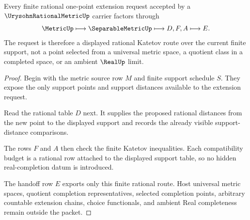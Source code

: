\begin{theorem}
\label{thm:urysohn-rational-metric-one-point-extension}
Every finite rational one-point extension request accepted by a $\UrysohnRationalMetricUp$ carrier factors through
$$
\MetricUp \longmapsto \SeparableMetricUp \longmapsto D,F,A \longmapsto E .
$$
The request is therefore a displayed rational Katetov route over the current finite support, not a point selected from a universal metric space, a quotient class in a completed space, or an ambient $\RealUp$ limit.
\end{theorem}
\begin{proof}
Begin with the metric source row $M$ and finite support schedule $S$. They expose the only support points and support distances available to the extension request.

Read the rational table $D$ next. It supplies the proposed rational distances from the new point to the displayed support and records the already visible support-distance comparisons.

The rows $F$ and $A$ then check the finite Katetov inequalities. Each compatibility budget is a rational row attached to the displayed support table, so no hidden real-completion datum is introduced.

The handoff row $E$ exports only this finite rational route. Host universal metric spaces, quotient completion representatives, selected completion points, arbitrary countable extension chains, choice functionals, and ambient Real completeness remain outside the packet.
\end{proof}



